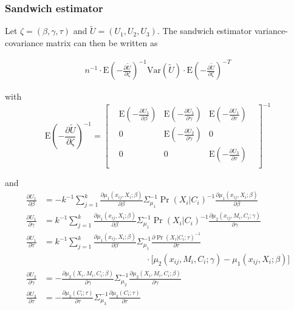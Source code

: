 \documentclass[]{article}
\begin{document}
\subsubsection*{Sandwich estimator}

Let $\zeta = (\beta, \gamma, \tau)$ and $\tilde U = (U_1, U_2, U_3)$. The sandwich estimator variance-covariance matrix can then be written as

\begin{eqnarray*}
\displaystyle n^{-1}\cdot\mbox{E}\left(-\frac{\partial \tilde U}{\partial \zeta}\right)^{-1} \mbox{Var}(\tilde U) \cdot \mbox{E}\left(-\frac{\partial \tilde U}{\partial \zeta}\right)^{-T}
\end{eqnarray*}

\noindent with 
\[
\renewcommand\arraystretch{2.5}
\displaystyle \mbox{E}\left(-\frac{\partial \tilde U}{\partial \zeta}\right)^{-1} = 
\begin{bmatrix}
& \displaystyle\mbox{E}\left(-\frac{\partial U_1}{\partial \beta}\right) & \displaystyle\mbox{E}\left(-\frac{\partial U_1}{\partial \gamma}\right) & \displaystyle\mbox{E}\left(-\frac{\partial U_1}{\partial \tau}\right) &\\
& 0 & \displaystyle\mbox{E}\left(-\frac{\partial U_2}{\partial \gamma}\right) & 0 &\\
& 0 & 0 & \displaystyle\mbox{E}\left(-\frac{\partial U_3}{\partial \tau}\right) &\\
\end{bmatrix}^{-1}
\]

\noindent and
\begin{align*}
\displaystyle \frac{\partial U_1}{\partial \beta} &= - k^{-1} \sum_{j=1}^{k} \frac{\partial \mu_1(x_{ij},X_i;\beta)}{\partial \beta} \Sigma_{\mu_1}^{-1} \Pr(X_i\vert C_i)^{-1} \frac{\partial \mu_1(x_{ij},X_i;\beta)}{\partial \beta}\\[0.6em]
\displaystyle \frac{\partial U_1}{\partial \gamma} &= k^{-1} \sum_{j=1}^{k} \frac{\partial \mu_1(x_{ij},X_i;\beta)}{\partial \beta} \Sigma_{\mu_1}^{-1} \Pr(X_i\vert C_i)^{-1} \frac{\partial \mu_2(x_{ij}, M_i,C_i;\gamma)}{\partial \gamma}\\[0.6em]
\displaystyle \frac{\partial U_1}{\partial \tau} &= k^{-1} \sum_{j=1}^{k} \frac{\partial \mu_1(x_{ij},X_i;\beta)}{\partial \beta} \Sigma_{\mu_1}^{-1} \frac{\partial \Pr(X_i\vert C_i;\tau)^{-1}}{\partial \tau}\\[-0.6em] & \qquad \qquad \qquad \qquad \qquad \qquad \cdot \big[ \mu_2(x_{ij},M_i,C_i;\gamma) - \mu_1(x_{ij},X_i;\beta) \big]\\[0.6em]
\displaystyle \frac{\partial U_2}{\partial \gamma} &= - \frac{\partial \mu_2(X_i,M_i,C_i;\beta)}{\partial \gamma} \Sigma_{\mu_2}^{-1} \frac{\partial \mu_2(X_i,M_i,C_i;\beta)}{\partial \gamma}\\[0.6em]
\displaystyle \frac{\partial U_3}{\partial \tau} &= - \frac{\partial \mu_3(C_i;\tau)}{\partial \tau} \Sigma_{\mu_3}^{-1} \frac{\partial \mu_3(C_i;\tau)}{\partial \tau}
\end{align*}
\end{document}
